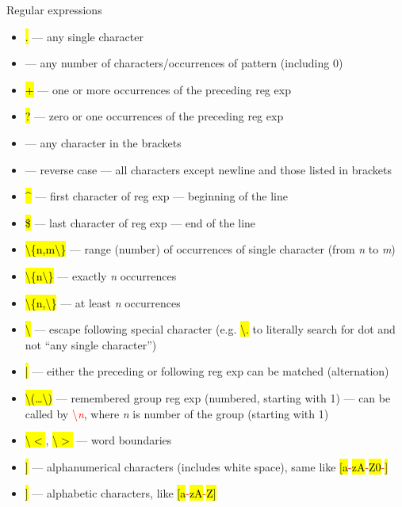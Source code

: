 \documentclass[compress, ucs, xelatex, 11pt, xcolor=svgnames, aspectratio=169,
	hyperref={
		bookmarks=true,
		unicode=true,
		colorlinks=true,
		pdftitle={Linux, command line and MetaCentrum},
		plainpages=false,
		pdfauthor={Vojtech Zeisek},
		pdfsubject={Course about use of Linux command line, writing shell scripts and using MetaCentrum of CESNET},
		pdfcreator={XeLaTeX},
		pdfkeywords={Linux, GNU, BASH, shell, command line, MetaCentrum},
		linkcolor=DarkRed, %
		anchorcolor=DarkBlue, %
		citecolor=Indigo, %
		filecolor=NavyBlue, %
		menucolor=DarkMagenta, %
		urlcolor=DarkBlue, %
		pdftex},
	url={hyphens, lowtilde} %
	]{beamer}
\renewcommand{\texttt}[1]{\hl{\ttfamily #1}}
\renewcommand{\alert}[1]{\textcolor{red}{#1}}
\begin{document}
\begin{frame}[allowframebreaks]{Regular expressions}
	\label{regexp}
	\begin{itemize}
		\item \alert{\texttt{.}} --- any single character
		\item \alert{\texttt{*}} --- any number of characters/occurrences of pattern (including 0)
		\item \alert{\texttt{+}} --- one or more occurrences of the preceding reg exp
		\item \alert{\texttt{?}} --- zero or one occurrences of the preceding reg exp
		\item \alert{\texttt{[\ldots]}} --- any character in the brackets
		\item \alert{\texttt{[\textasciicircum\ldots]}} --- reverse case --- all characters except newline and those listed in brackets
		\item \alert{\texttt{\textasciicircum}} --- first character of reg exp --- beginning of the line
		\item \alert{\texttt{\$}} --- last character of reg exp --- end of the line
		\item \alert{\texttt{\textbackslash\{n,m\textbackslash\}}} --- range (number) of occurrences of single character (from \textit{n} to \textit{m})
		\item \alert{\texttt{\textbackslash\{n\textbackslash\}}} --- exactly \textit{n} occurrences
		\item \alert{\texttt{\textbackslash\{n,\textbackslash\}}} --- at least \textit{n} occurrences
		\item \alert{\texttt{\textbackslash}} --- escape following special character (e.g. \texttt{\textbackslash .} to literally search for dot and not \enquote{any single character})
		\item \alert{\texttt{|}} --- either the preceding or following reg exp can be matched (alternation)
		\item \alert{\texttt{\textbackslash(\ldots\textbackslash)}} --- remembered group reg exp (numbered, starting with 1) --- can be called by \alert{\textbackslash\textit{n}}, where \textit{n} is number of the group (starting with 1)
		\item \alert{\texttt{\textbackslash$<$}}, \alert{\texttt{\textbackslash$>$}} --- word boundaries
		\item \alert{\texttt{[[:alnum:]]}} --- alphanumerical characters (includes white space), same like \alert{\texttt{[a}-\texttt{zA}-\texttt{Z0}-\texttt{9]}}
		\item \alert{\texttt{[[:alpha:]]}} --- alphabetic characters, like \alert{\texttt{[a}-\texttt{zA}-\texttt{Z]}}

\end{itemize}
\end{frame}
\end{document}
